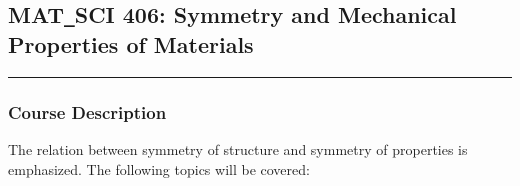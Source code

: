 	\subsection{MAT\texttt{\_}SCI 406: Symmetry and Mechanical Properties of Materials}
	\vspace{-0.5em} \hfill \rule{0.4\textwidth}{.4pt}\newline
	\null \hfill {} \newline
	\null \hfill {}
\normalfont
		\subsubsection*{Course Description}
The relation between symmetry of structure and symmetry of properties is emphasized. The following topics will be covered:

